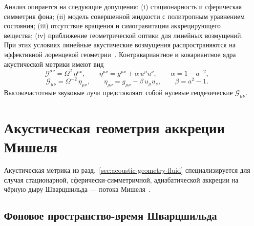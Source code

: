 \documentclass[12pt,a4paper,preprint]{elsarticle}
\begin{document}
            Анализ опирается на следующие допущения: (i) стационарность и сферическая симметрия фона; (ii) модель совершенной жидкости с политропным уравнением состояния; (iii) отсутствие вращения и самогравитации аккрецирующего вещества; (iv) приближение геометрической оптики для линейных возмущений. При этих условиях линейные акустические возмущения распространяются на эффективной лоренцевой геометрии~\cite{BilicN_RelativisticAcousticGeometry_1999, VisserM_AcousticBlackHolesHorizonsErgospheresAndHawkingRadiation_1998, BarceloC_LiberatiS_VisserM_AnalogueGravity_2011}. Контравариантное и ковариантное ядра акустической метрики имеют вид
            \begin{equation}
                \mathcal{G}^{\mu\nu} = \Omega^{2}\,\eta^{\mu\nu} , \qquad \eta^{\mu\nu} = g^{\mu\nu} + \alpha\, u^{\mu} u^{\nu} , \qquad \alpha = 1 - a^{-2} ,
                \label{eq:acoustic-metric-tensor}
            \end{equation}
            \begin{equation}
                \mathcal{G}_{\mu\nu} = \Omega^{-2}\,\eta_{\mu\nu} , \qquad \eta_{\mu\nu} = g_{\mu\nu} - \beta\, u_{\mu} u_{\nu} , \qquad \beta = a^{2} - 1 .
                \label{eq:covariant-acoustic-metric-tensor}
            \end{equation}
            Высокочастотные звуковые лучи представляют собой нулевые геодезические $\mathcal{G}_{\mu\nu}$.

    \section{Акустическая геометрия аккреции Мишеля}\label{sec:acoustic-geometry}

        Акустическая метрика из разд.~\ref{sec:acoustic-geometry-fluid} специализируется для случая стационарной, сферически-симметричной, адиабатической аккреции на чёрную дыру Шварцшильда --- потока Мишеля~\cite{MichelFC_AccretionOfMatterByCondensedObjects_1972}.

        \subsection{Фоновое пространство-время Шварцшильда}\label{subsec:schwarzschild-background}
\end{document}
